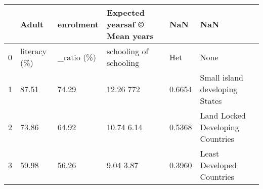 \begin{tabular}{llllll}
\toprule
{} &         Adult &   enrolment & Expected yearsaf © Mean years &     NaN &                               NaN \\
\midrule
0 &  literacy (\%) &  \_ratio (\%) &        schooling of schooling &     Het &                              None \\
1 &         87.51 &       74.29 &                     12.26 772 &  0.6654 &    Small island developing States \\
2 &         73.86 &       64.92 &                    10.74 6.14 &  0.5368 &  Land Locked Developing Countries \\
3 &         59.98 &       56.26 &                     9.04 3.87 &  0.3960 &         Least Developed Countries \\
\bottomrule
\end{tabular}
